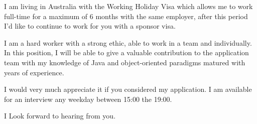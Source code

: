 \documentclass[11pt, a4paper]{awesome-cv}
\begin{document}
\begin{cvletter}
I am living in Australia with the Working Holiday Visa which allows me to work full-time for a maximum of 6 months with the same employer, after this period I’d like to continue to work for you with a sponsor visa.



I am a hard worker with a strong ethic, able to work in a team and individually. In this position, I will be able to give a valuable contribution to the application team with my knowledge of Java and object-oriented paradigms matured with years of experience.

I would very much appreciate it if you considered my application. I am available for an interview any weekday between 15:00 the 19:00.

I Look forward to hearing from you.

\end{cvletter}


\makeletterclosing
\end{document}
